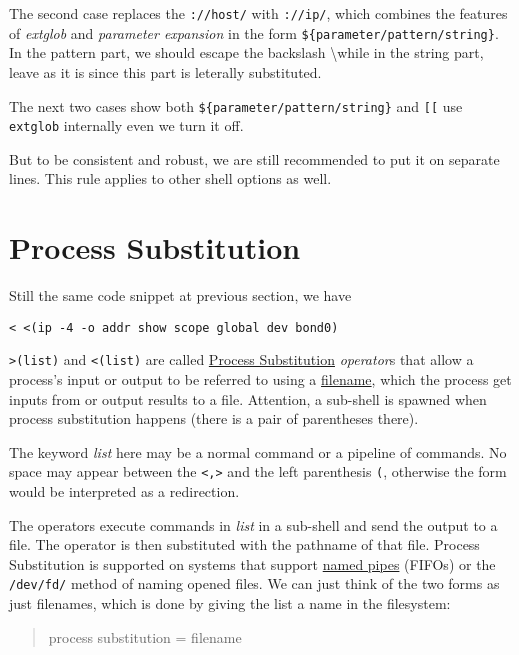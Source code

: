 The second case replaces the \lstinline|://host/| with
\lstinline|://ip/|, which combines the features of
\textit{extglob} and \textit{parameter expansion} in the form
\lstinline|${parameter/pattern/string}|. In the pattern part, we
should escape the backslash \textbackslash while in the string
part, leave as it is since this part is leterally substituted.

The next two cases show both
\lstinline|${parameter/pattern/string}| and \verb|[[| use
\lstinline|extglob| internally even we turn it off.

But to be consistent and robust, we are still recommended to put
it on separate lines. This rule applies to other shell options as
well.

\section{Process Substitution}
\label{sec:bash-process-substitution}

Still the same code snippet at previous section, we have

\begin{lstlisting}
< <(ip -4 -o addr show scope global dev bond0)
\end{lstlisting}

\lstinline|>(list)| and \lstinline|<(list)| are called
\href{https://www.gnu.org/software/bash/manual/bash.html#Process-Substitution}{Process
  Substitution} \textit{operator}s that allow a process's input or
output to be referred to using a \uline{filename}, which the
process get inputs from or output results to a file. Attention, a
sub-shell is spawned when process substitution happens (there is a
pair of parentheses there).

The keyword \textit{list} here may be a normal command or a
pipeline of commands. No space may appear between the \verb|<,>|
and the left parenthesis \verb|(|, otherwise the form would be
interpreted as a redirection.

The operators execute commands in \textit{list} in a sub-shell
and send the output to a file. The operator is then substituted
with the pathname of that file. Process Substitution is supported
on systems that support
\href{http://mywiki.wooledge.org/NamedPipes}{named pipes} (FIFOs)
or the \verb|/dev/fd/| method of naming opened files. We can just
think of the two forms as just filenames, which is done by giving
the list a name in the filesystem:

\begin{quotation}
  process substitution = filename
\end{quotation}

